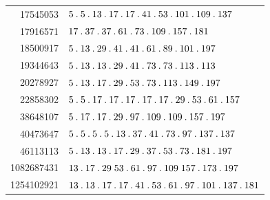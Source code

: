 \begin{longtable}{@{}r|l@{}}
17545053 & $5\pdot 5\pdot 13\pdot 17\pdot 17\pdot 41\pdot 53\pdot 101\pdot 109\pdot 137$\\
17916571 & $17\pdot 37\pdot 37\pdot 61\pdot 73\pdot 109\pdot 157\pdot 181$\\
18500917 & $5\pdot 13\pdot 29\pdot 41\pdot 41\pdot 61\pdot 89\pdot 101\pdot 197$\\
19344643 & $5\pdot 13\pdot 13\pdot 29\pdot 41\pdot 73\pdot 73\pdot 113\pdot 113$\\
20278927 & $5\pdot 13\pdot 17\pdot 29\pdot 53\pdot 73\pdot 113\pdot 149\pdot 197$\\
22858302 & $5\pdot 5\pdot 17\pdot 17\pdot 17\pdot 17\pdot 17\pdot 29\pdot 53\pdot 61\pdot 157$\\
38648107 & $5\pdot 17\pdot 17\pdot 29\pdot 97\pdot 109\pdot 109\pdot 157\pdot 197$\\
40473647 & $5\pdot 5\pdot 5\pdot 5\pdot 13\pdot 37\pdot 41\pdot 73\pdot 97\pdot 137\pdot 137$\\
46113113 & $5\pdot 13\pdot 13\pdot 17\pdot 29\pdot 37\pdot 53\pdot 73\pdot 181\pdot 197$\\
1082687431 & $13\pdot 17\pdot 29\;53\pdot 61\pdot 97\pdot 109\;157\pdot 173\pdot 197$\\
1254102921 & $13\pdot 13\pdot 17\pdot 17\pdot 41\pdot 53\pdot 61\pdot 97\pdot 101\pdot 137\pdot 181$\\
\end{longtable}\endgroup
\par\medskip\begingroup\small\setlength{\tabcolsep}{5pt}

